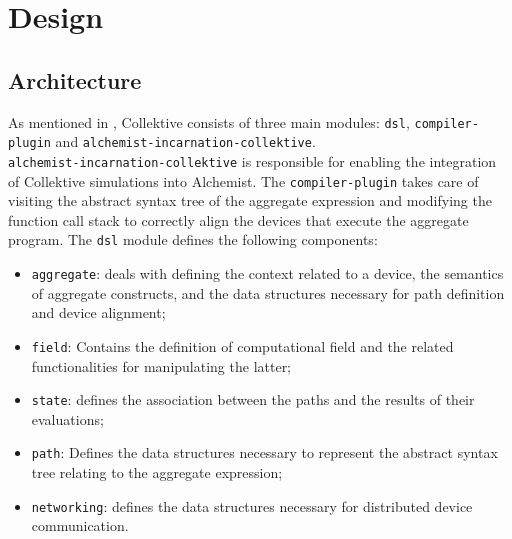 
\chapter{Design}
\label{chap:design}

\section{Architecture}

As mentioned in , Collektive consists of three main modules: \texttt{dsl}, \texttt{compiler-plugin} and \texttt{alchemist-incarnation-collektive}.\\ \texttt{alchemist-incarnation-collektive} is responsible for enabling the integration of Collektive simulations into Alchemist. The \texttt{compiler-plugin} takes care of visiting the abstract syntax tree of the aggregate expression and modifying the function call stack to correctly align the devices that execute the aggregate program. The \texttt{dsl} module defines the following components:
\begin{itemize}
    \item \texttt{aggregate}: deals with defining the context related to a device, the semantics of aggregate constructs, and the data structures necessary for path definition and device alignment;
    \item \texttt{field}: Contains the definition of computational field and the related functionalities for manipulating the latter;
    \item \texttt{state}: defines the association between the paths and the results of their evaluations;
    \item \texttt{path}: Defines the data structures necessary to represent the abstract syntax tree relating to the aggregate expression;
    \item \texttt{networking}: defines the data structures necessary for distributed device communication.
\end{itemize}

